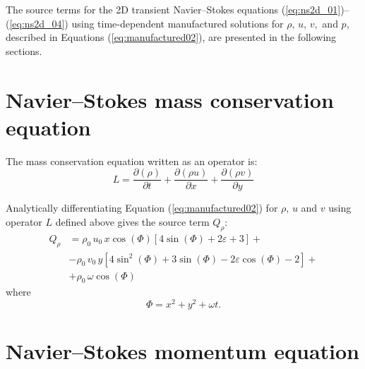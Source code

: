 \documentclass[10pt]{article}
\newcommand{\Diff}[2] {\dfrac{\partial( #1)}{\partial #2}}
\begin{document}
The source terms for the 2D transient Navier--Stokes equations (\ref{eq:ns2d_01})--(\ref{eq:ns2d_04}) using time-dependent manufactured solutions  for $\rho,\,u,\,v,$ and $p$, described in Equations (\ref{eq:manufactured02}), are presented in the following sections.


\section{Navier--Stokes mass conservation equation}

The mass conservation equation written as an operator is:
\begin{equation}
 \label{eq:ns2d_11}
L= \Diff{\rho}{t} + \Diff{\rho u}{x}+\Diff{\rho v}{y} 
\end{equation}

Analytically differentiating Equation (\ref{eq:manufactured02}) for $\rho$, $u$ and $v$ using operator $L$ defined above gives  the source term $Q_{\rho}$:
\begin{equation}
\begin{split}
Q_\rho
&= \rho_0\, u_0\, x \cos(\Phi)[4 \sin(\Phi)+2 \varepsilon+3] +\\
&- \rho_0\, v_0\, y[4 \sin^2(\Phi)+3 \sin(\Phi)-2 \varepsilon \cos(\Phi)-2] +\\
&+\rho_0\, \omega \cos(\Phi)
\end{split}
\end{equation}
where $$\Phi=x^2 +y^2 +\omega t.$$

\section{Navier--Stokes momentum equation}
\end{document}
